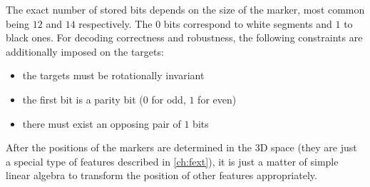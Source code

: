 The exact number of stored bits depends on the size of the marker, most common being $12$ and $14$ respectively.
The $0$ bits correspond to white segments and $1$ to black ones.
For decoding correctness and robustness, the following constraints are additionally imposed on the targets:

\begin{itemize}
	\item the targets must be rotationally invariant
	\item the first bit is a parity bit ($0$ for odd, $1$ for even)
	\item there must exist an opposing pair of $1$ bits
\end{itemize}

After the positions of the markers are determined in the 3D space (they are just a special type of features described in \ref{ch:fext}), it is just a matter of simple linear algebra to transform the position of other features appropriately.
